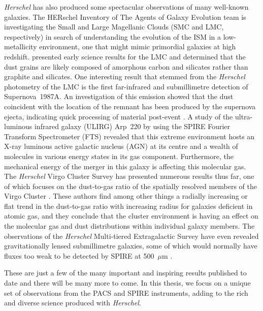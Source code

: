 \emph{Herschel} has also produced some spectacular observations of many well-known galaxies.  The HERschel Inventory of The Agents of Galaxy Evolution \citep[HERITAGE; ][]{2010A&A...518L..71M} team is investigating the Small and Large Magellanic Clouds (SMC and LMC, respectively) in search of understanding the evolution of the ISM in a low-metallicity environment, one that might mimic primordial galaxies at high redshift.  \citet{2010A&A...518L..71M} presented early science results for the LMC and determined that the dust grains are likely composed of amorphous carbon and silicates rather than graphite and silicates.  One interesting result that stemmed from the \emph{Herschel} photometry of the LMC is the first far-infrared and submillimetre detection of Supernova~1987A.  An investigation of this emission showed that the dust coincident with the location of the remnant has been produced by the supernova ejecta, indicating quick processing of material post-event \citep{2011Sci...333.1258M}.  A study of the ultra-luminous infrared galaxy (ULIRG) Arp~220 by \citet{2011ApJ...743...94R} using the SPIRE Fourier Transform Spectrometer (FTS) revealed that this extreme environment hosts an X-ray luminous active galactic nucleus (AGN) at its centre and a wealth of molecules in various energy states in its gas component.  Furthermore, the mechanical energy of the merger in this galaxy is affecting this molecular gas.  The \emph{Herschel} Virgo Cluster Survey has presented numerous results thus far, one of which focuses on the dust-to-gas ratio of the spatially resolved members of the Virgo Cluster \citep{2012A&A...545A..75P}.  These authors find among other things a radially increasing or flat trend in the dust-to-gas ratio with increasing radius for galaxies deficient in atomic gas, and they conclude that the cluster environment is having an effect on the molecular gas and dust distributions within individual galaxy members.  The observations of the \emph{Herschel} Multi-tiered Extragalactic Survey have even revealed gravitationally lensed submillimetre galaxies, some of which would normally have fluxes too weak to be detected by SPIRE at 500~$\mu$m \citep{2013ApJ...762...59W}.

These are just a few of the many important and inspiring results published to date and there will be many more to come.  In this thesis, we focus on a unique set of observations from the PACS and SPIRE instruments, adding to the rich and diverse science produced with \emph{Herschel}.




